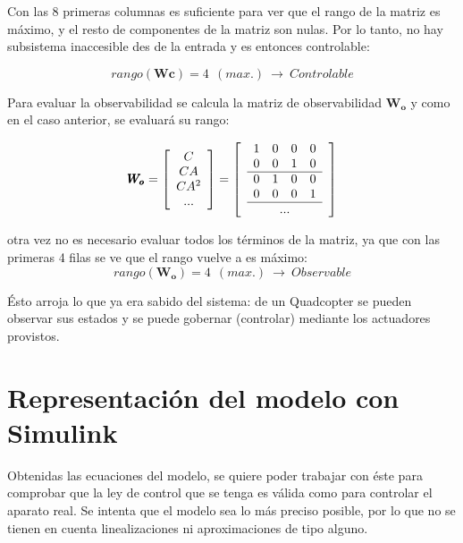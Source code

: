 \documentclass[twoside,11pt]{book}
\begin{document}
Con las 8 primeras columnas es suficiente para ver que el rango de la matriz es máximo, y el resto de componentes de la matriz son nulas. Por lo tanto, no hay subsistema inaccesible des de la entrada y es entonces controlable:

\begin{equation}
rango(\pmb{Wc})=4\>\>(max.)\> \rightarrow \>Controlable
\end{equation}

Para evaluar la observabilidad se calcula la matriz de observabilidad $\pmb{W_o}$ y como en el caso anterior, se evaluará su rango:

\begin{equation}
\pmb{W_o}=\left[ \begin{array}{c}
C \\
CA \\
CA^2 \\
...
\end{array}\right] =\left[\begin{array}{c}

\begin{array}{cccc}
1 & 0 & 0 & 0 \\
0 & 0 & 1 & 0 \\
\hline 
0 & 1 & 0 & 0 \\
0 & 0 & 0 & 1 \\
\hline
\end{array}\\
...\\ \end{array} \right]
\end{equation}

otra vez no es necesario evaluar todos los términos de la matriz, ya que con las primeras 4 filas se ve que el rango vuelve a es máximo:
\begin{equation}
rango(\pmb{W_o})=4\>\>(max.) \> \rightarrow \> Observable
\end{equation}

Ésto arroja lo que ya era sabido del sistema: de un Quadcopter se pueden observar sus estados y se puede gobernar (controlar) mediante los actuadores provistos. 

\newpage
\section{Representación del modelo con Simulink}

Obtenidas las ecuaciones del modelo, se quiere poder trabajar con éste para comprobar que la ley de control que se tenga es válida como para controlar el aparato real. Se intenta que el modelo sea lo más preciso posible, por lo que no se tienen en cuenta linealizaciones ni aproximaciones de tipo alguno. 
\end{document}
